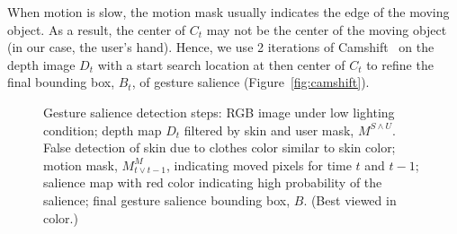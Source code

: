\documentclass{sigchi}
\begin{document}
When motion is slow, the motion mask usually indicates the edge of the moving
object. As a result, the center of $C_t$ may not be the center of the moving
object (in our case, the user's hand). Hence, we use 2 iterations of Camshift~\cite{Bradski98} on the depth image $D_t$ with a start search location at then center of $C_t$ to refine
the final bounding box, $B_t$, of gesture salience (Figure~\ref{fig:camshift}).

\begin{figure}[tb]
\centering
\hspace{-0.6em}%
\caption{Gesture salience detection steps:  RGB image under low lighting condition;
 depth map $D_t$ filtered by skin and user mask, $M^{S\wedge U}$. False detection of skin due to
clothes color similar to skin color;  motion mask,  $M_{t\vee t-1}^M$, indicating moved pixels for time $t$ and $t-1$;
 salience map with red color indicating high probability of the salience; 
 final gesture salience bounding box, $B$. (Best viewed in
color.)}
\label{fig:gesture-salience}
\end{figure}
\end{document}
